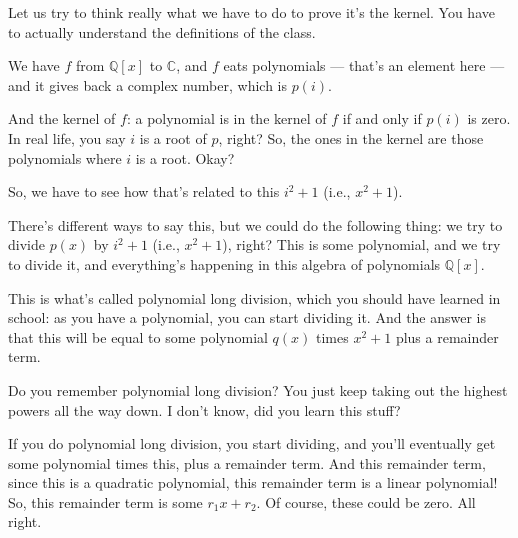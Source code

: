 \begin{speech}[01:25:52 - 01:28:30]
Let us try to think really what we have to do to prove it's the kernel. You have to actually understand the definitions of the class. 

We have $f$ from $\mathbb{Q}[x]$ to $\mathbb{C}$,  and $f$ eats polynomials --- that's an element here --- and it gives back a complex number, which is $p(i)$.  

And the kernel of $f$: a polynomial is in the kernel of $f$ if and only if $p(i)$ is zero.  In real life, you say $i$ is a root of $p$,  right? So, the ones in the kernel are those polynomials where $i$ is a root. Okay? 

So, we have to see how that's related to this $i^2 + 1$ (i.e., $x^2 + 1$).

There's different ways to say this, but we could do the following thing: we try to divide $p(x)$ by $i^2 + 1$ (i.e., $x^2 + 1$),  right? This is some polynomial, and we try to divide it, and everything's happening in this algebra of polynomials $\mathbb{Q}[x]$.  

This is what's called polynomial long division, which you should have learned in school: as you have a polynomial, you can start dividing it. And the answer is that this will be equal to some polynomial $q(x)$ times $x^2 + 1$ plus a remainder term.  

Do you remember polynomial long division? You just keep taking out the highest powers all the way down. I don't know, did you learn this stuff? 

If you do polynomial long division, you start dividing, and you'll eventually get some polynomial times this, plus a remainder term. And this remainder term, since this is a quadratic polynomial, this remainder term is a linear polynomial!  So, this remainder term is some $r_1 x + r_2$.  Of course, these could be zero. All right.
\end{speech}

